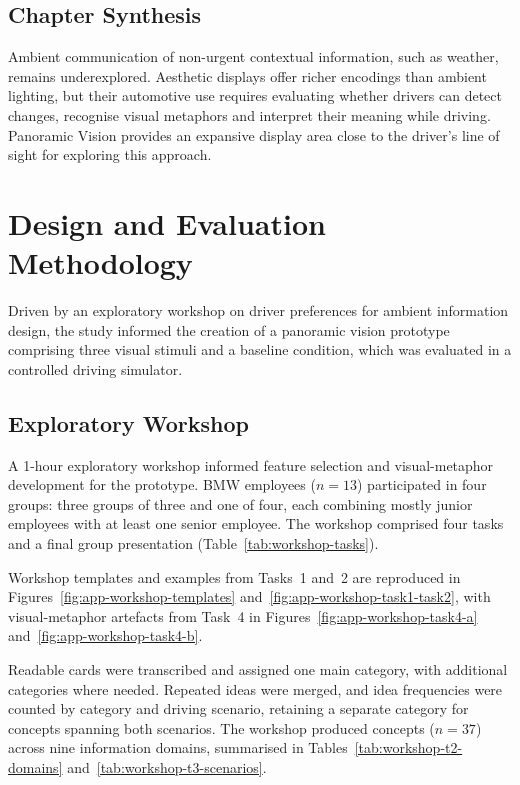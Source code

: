 \documentclass[
english,                 %
bibtex,                  %
includeExtraAbstracts, %
]{kththesis}
\numberwithin{listing}{chapter}
\begin{document}
\section{Chapter Synthesis}
\label{sec:chapter-synthesis}

Ambient communication of non-urgent contextual information, such as weather, remains underexplored. Aesthetic displays offer richer encodings than ambient lighting, but their automotive use requires evaluating whether drivers can detect changes, recognise visual metaphors and interpret their meaning while driving. Panoramic Vision provides an expansive display area close to the driver's line of sight for exploring this approach.

\chapter{Design and Evaluation Methodology}
\label{ch:methods}

Driven by an exploratory workshop on driver preferences for ambient information design, the study informed the creation of a panoramic vision prototype comprising three visual stimuli and a baseline condition, which was evaluated in a controlled driving simulator.

\section{Exploratory Workshop}
\label{sec:exploratory-workshop}

A 1-hour exploratory workshop informed feature selection and visual-metaphor development for the prototype. BMW employees ($n = 13$) participated in four groups: three groups of three and one of four, each combining mostly junior employees with at least one senior employee. The workshop comprised four tasks and a final group presentation (Table~\ref{tab:workshop-tasks}).

Workshop templates and examples from Tasks~1 and~2 are reproduced in Figures~\ref{fig:app-workshop-templates} and~\ref{fig:app-workshop-task1-task2}, with visual-metaphor artefacts from Task~4 in Figures~\ref{fig:app-workshop-task4-a} and~\ref{fig:app-workshop-task4-b}.

Readable cards were transcribed and assigned one main category, with additional categories where needed. Repeated ideas were merged, and idea frequencies were counted by category and driving scenario, retaining a separate category for concepts spanning both scenarios. The workshop produced concepts ($n = 37$) across nine information domains, summarised in Tables~\ref{tab:workshop-t2-domains} and~\ref{tab:workshop-t3-scenarios}.
\end{document}
